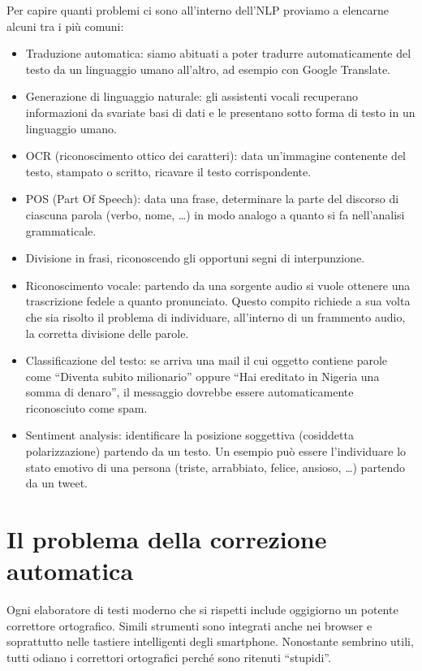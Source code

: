 Per capire quanti problemi ci sono all'interno dell'NLP proviamo a elencarne alcuni tra i più comuni:
\begin{itemize}
	\item Traduzione automatica: siamo abituati a poter tradurre automaticamente del testo da un linguaggio umano all'altro, ad esempio con Google Translate.
	\item Generazione di linguaggio naturale: gli assistenti vocali recuperano informazioni da svariate basi di dati e le presentano sotto forma di testo in un linguaggio umano.
	\item OCR (riconoscimento ottico dei caratteri): data un'immagine contenente del testo, stampato o scritto, ricavare il testo corrispondente.
	\item POS (Part Of Speech): data una frase, determinare la parte del discorso di ciascuna parola (verbo, nome, \dots) in modo analogo a quanto si fa nell'analisi grammaticale. 
	\item Divisione in frasi, riconoscendo gli opportuni segni di interpunzione.
	\item Riconoscimento vocale: partendo da una sorgente audio si vuole ottenere una trascrizione fedele a quanto pronunciato. Questo compito richiede a sua volta che sia risolto il problema di individuare, all'interno di un frammento audio, la corretta divisione delle parole.
	\item Classificazione del testo: se arriva una mail il cui oggetto contiene parole come ``Diventa subito milionario'' oppure ``Hai ereditato in Nigeria una somma di denaro'', il messaggio dovrebbe essere automaticamente riconosciuto come spam.
	\item Sentiment analysis: identificare la posizione soggettiva (cosiddetta polarizzazione) partendo da un testo. Un esempio può essere l'individuare lo stato emotivo di una persona (triste, arrabbiato, felice, ansioso, \dots) partendo da un tweet.	
	
\end{itemize} 

\section{Il problema della correzione automatica}

Ogni elaboratore di testi moderno che si rispetti include oggigiorno un potente correttore ortografico. Simili strumenti sono integrati anche nei browser e soprattutto nelle tastiere intelligenti degli smartphone. Nonostante sembrino utili, tutti odiano i correttori ortografici perché sono ritenuti ``stupidi''.

